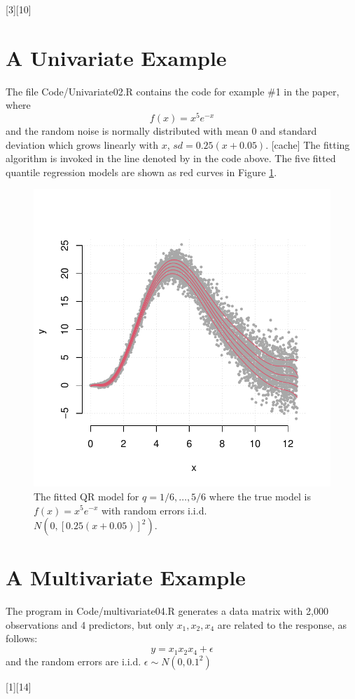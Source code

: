 \documentclass[a4paper,12pt]{article}
\newcommand{\dcircle}[1]{\ding{\numexpr181 + #1}}
\begin{document}
[3][10]

\section{A Univariate Example}
The file Code/Univariate02.R  contains the code for example \#1 in the paper, where $$f(x)=x^{5}e^{-x}$$ and the random noise is normally distributed with mean 0 and standard deviation which grows linearly with $x$, $sd=0.25(x+0.05)$.
[cache]
The fitting algorithm is invoked in the line denoted by \small\dcircle{1} in the code above. The five fitted quantile regression models are shown as red curves in Figure \ref{Example1}.


\begin{figure}[t!]
\centering
\includegraphics[width=.5\linewidth]{Figures/Uni02.pdf}
\caption{The fitted QR model for $q=1/6,\ldots,5/6$ where the true model is $f(x)=x^{5}e^{-x}$ with random errors i.i.d. $N(0, [0.25(x+0.05)]^2)$.}\label{Example1}
\end{figure} 
 


\section{A Multivariate Example}
The program in Code/multivariate04.R generates a data matrix with 2,000 observations and 4 predictors, but only $x_1, x_2, x_4$ are related to the response, as follows:
$$y = x_1x_2x_4 + \epsilon$$
and the random errors are i.i.d. $\epsilon\sim N(0, 0.1^2)$

[1][14]
\end{document}
